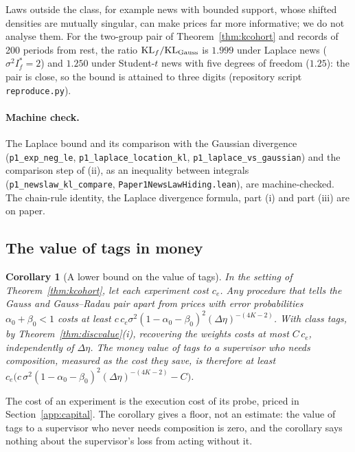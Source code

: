 \documentclass[12pt]{article}
\newtheorem{corollary}[theorem]{Corollary}
\theoremstyle{definition}
\theoremstyle{remark}
\begin{document}
Laws outside the class, for example news with bounded support, whose shifted densities are mutually singular, can make prices far more informative; we do not analyse them. For the two-group pair of Theorem~\ref{thm:kcohort} and records of 200 periods from rest, the ratio $\mathrm{KL}_f/\mathrm{KL}_{\rm Gauss}$ is $1.999$ under Laplace news ($\sigma^2I^*_f=2$) and $1.250$ under Student-$t$ news with five degrees of freedom ($1.25$): the pair is close, so the bound is attained to three digits (repository script \nolinkurl{reproduce.py}).

\paragraph{Machine check.} The Laplace bound and its comparison with the Gaussian divergence (\texttt{p1\_exp\_neg\_le}, \texttt{p1\_laplace\_location\_kl}, \texttt{p1\_laplace\_vs\_gaussian}) and the comparison step of (ii), as an inequality between integrals (\texttt{p1\_newslaw\_kl\_compare}, \nolinkurl{Paper1NewsLawHiding.lean}), are machine-checked. The chain-rule identity, the Laplace divergence formula, part (i) and part (iii) are on paper.

\subsection{The value of tags in money}

\begin{corollary}[A lower bound on the value of tags]\label{cor:money}
In the setting of Theorem~\ref{thm:kcohort}, let each experiment cost $c_e$. Any procedure that tells the Gauss and Gauss--Radau pair apart from prices with error probabilities $\alpha_0+\beta_0<1$ costs at least $c\,c_e\sigma^2(1-\alpha_0-\beta_0)^2(\Delta\eta)^{-(4K-2)}$. With class tags, by Theorem~\ref{thm:discvalue}(i), recovering the weights costs at most $C\,c_e$, independently of $\Delta\eta$. The money value of tags to a supervisor who needs composition, measured as the cost they save, is therefore at least $c_e\bigl(c\,\sigma^2(1-\alpha_0-\beta_0)^2(\Delta\eta)^{-(4K-2)}-C\bigr)$.
\end{corollary}

The cost of an experiment is the execution cost of its probe, priced in Section~\ref{app:capital}. The corollary gives a floor, not an estimate: the value of tags to a supervisor who never needs composition is zero, and the corollary says nothing about the supervisor's loss from acting without it.
\end{document}
